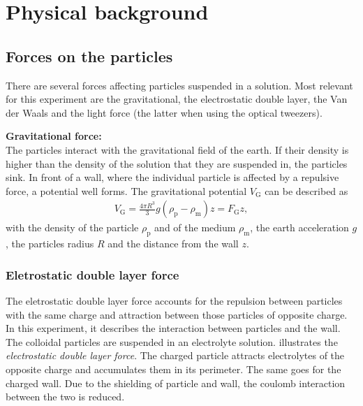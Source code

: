\documentclass[.../bericht]{subfilies}
\begin{document}
\chapter{Physical background}


  \section{Forces on the particles}
  \label{sec:forces}

    There are several forces affecting particles suspended in a solution. Most relevant for this experiment are the gravitational, the electrostatic double layer, the Van der Waals and the light force (the latter when using the optical tweezers).
    \medskip

    \textbf{Gravitational force:}\\
    The particles interact with the gravitational field of the earth. If their density is higher than the density of the solution that they are suspended in, the particles sink. In front of a wall, where the individual particle is affected by a repulsive force, a potential well forms.  The gravitational potential $V_\mathrm{G}$ can be described as
    \begin{align}
    V_\mathrm{G}=\frac{4\pi R^3}{3}g(\rho_\mathrm{p}-\rho_\mathrm{m})z=F_\mathrm{G}z,
    \end{align}
    with the density of the particle $\rho_\mathrm{p}$ and of the medium $\rho_\mathrm{m}$, the earth acceleration $g$, the particles radius $R$ and the distance from the wall $z$.
    \medskip

    \subsection{Eletrostatic double layer force}
    \label{subsec:edlf}

    The eletrostatic double layer force accounts for the repulsion between particles with the same charge and attraction between those particles of opposite charge. In this experiment, it describes the interaction between particles and the wall. The colloidal particles are suspended in an electrolyte solution.  illustrates the \textit{electrostatic double layer force}. The charged particle attracts electrolytes of the opposite charge and accumulates them in its perimeter. The same goes for the charged wall. Due to the shielding of particle and wall, the coulomb interaction between the two is reduced.
    \medskip
\end{document}
